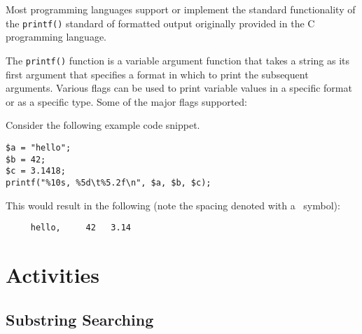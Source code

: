 \documentclass[12pt]{scrartcl}
\begin{document}
Most programming languages support or implement the standard 
functionality of the \texttt{printf()} standard of formatted 
output originally provided in the C programming language.

The \texttt{printf()} function is a variable argument 
function that takes a string as its first argument that specifies 
a format in which to print the subsequent arguments.  Various flags 
can be used to print variable values in a specific format or as a 
specific type.  Some of the major flags supported:
	
Consider the following example code snippet.

\begin{verbatim}
$a = "hello";
$b = 42;
$c = 3.1418;
printf("%10s, %5d\t%5.2f\n", $a, $b, $c);
\end{verbatim}

This would result in the following (note the spacing denoted
with a \textvisiblespace\ symbol):

\begin{verbatim}
     hello,     42	 3.14
\end{verbatim}     

\section*{Activities}

\subsection*{Substring Searching}
\end{document}
